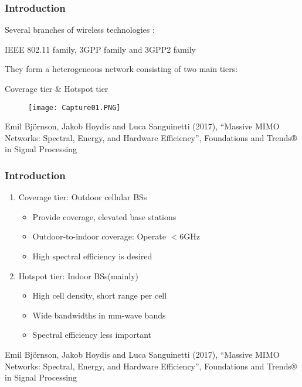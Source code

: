 \documentclass{beamer}
\begin{document}
\begin{frame}[fragile=singleslide]\frametitle{Introduction}
Several branches of wireless technologies :

\centerline{IEEE 802.11 family, 3GPP family and 3GPP2 family}


They form a heterogeneous network consisting of two main tiers:



\centerline{Coverage tier \& Hotspot tier}
 
\begin{figure}
  \texttt{[image: Capture01.PNG]}
\end{figure}



\tiny Emil Björnson, Jakob Hoydis and Luca Sanguinetti (2017), “Massive MIMO Networks: Spectral, Energy, and Hardware Efficiency”, Foundations and Trends® in Signal Processing

\end{frame}



\begin{frame}[fragile=singleslide]\frametitle{Introduction}
\begin{enumerate}
\item Coverage tier: Outdoor cellular BSs
\begin{itemize}
\item Provide coverage, elevated base stations
\item Outdoor-to-indoor coverage: Operate $<6$GHz
\item High spectral efficiency is desired
\end{itemize}

\vspace{1.2cm}

\item Hotspot tier: Indoor BSs(mainly)
\begin{itemize}
\item High cell density, short range per cell
\item Wide bandwidths in mm-wave bands
\item Spectral efficiency less important
\end{itemize}
\end{enumerate}

\vspace{1.2cm}

\tiny Emil Björnson, Jakob Hoydis and Luca Sanguinetti (2017), “Massive MIMO Networks: Spectral, Energy, and Hardware Efficiency”, Foundations and Trends® in Signal Processing

\end{frame}
\end{document}
